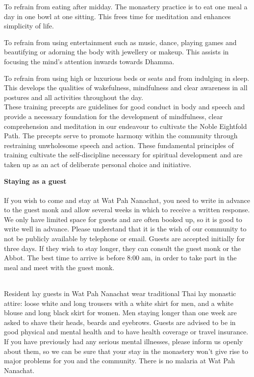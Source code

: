 To refrain from eating after midday. The monastery practice is to eat
one meal a day in one bowl at one sitting. This frees time for
meditation and enhances simplicity of life.

To refrain from using entertainment such as music, dance, playing games
and beautifying or adorning the body with jewellery or makeup. This
assists in focusing the mind's attention inwards towards Dhamma.

To refrain from using high or luxurious beds or seats and from indulging
in sleep. This develops the qualities of wakefulness, mindfulness and
clear awareness in all postures and all activities throughout the day.\\
These training precepts are guidelines for good conduct in body and
speech and provide a necessary foundation for the development of
mindfulness, clear comprehension and meditation in our endeavour to
cultivate the Noble Eightfold Path. The precepts serve to promote
harmony within the community through restraining unwholesome speech and
action. These fundamental principles of training cultivate the
self-discipline necessary for spiritual development and are taken up as
an act of deliberate personal choice and initiative.

\textbf{Staying as a guest}\\\\If you wish to come and stay at Wat Pah
Nanachat, you need to write in advance to the guest monk and allow
several weeks in which to receive a written response. We only have
limited space for guests and are often booked up, so it is good to write
well in advance. Please understand that it is the wish of our community
to not be publicly available by telephone or email. Guests are accepted
initially for three days. If they wish to stay longer, they can consult
the guest monk or the Abbot. The best time to arrive is before 8:00 am,
in order to take part in the meal and meet with the guest monk.

\\Resident lay guests in Wat Pah Nanachat wear traditional Thai lay
monastic attire: loose white and long trousers with a white shirt for
men, and a white blouse and long black skirt for women. Men staying
longer than one week are asked to shave their heads, beards and
eyebrows. Guests are advised to be in good physical and mental health
and to have health coverage or travel insurance. If you have previously
had any serious mental illnesses, please inform us openly about them, so
we can be sure that your stay in the monastery won't give rise to major
problems for you and the community. There is no malaria at Wat Pah
Nanachat.

